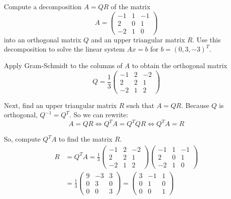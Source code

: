 \documentclass[12pt]{article}
\begin{document}
\begin{problem}{}{}
    Compute a decomposition $A = QR$ of the matrix
    $$
        A = \begin{pmatrix}
            -1 & 1 & -1 \\
            2 & 0 & 1 \\
            -2 & 1 & 0
        \end{pmatrix}
    $$
    into an orthogonal matrix $Q$ and an upper triangular matrix $R$. Use this decomposition to solve the linear system $Ax = b$ for $b = (0, 3, -3)^T$.
\end{problem}

Apply Gram-Schmidt to the columns of $A$ to obtain the orthogonal matrix
$$
    Q = \frac{1}{3} \begin{pmatrix}
        -1 & 2 & -2 \\
        2 & 2 & 1 \\
        -2 & 1 & 2
    \end{pmatrix}
$$

Next, find an upper triangular matrix $R$ such that $A = QR$. Because $Q$ is orthogonal, $Q^{-1} = Q^T$. So we can rewrite:
$$
    A = QR \iff Q^T A = Q^T Q R \iff Q^T A = R
$$

So, compute $Q^TA$ to find the matrix $R$. 
$$
\begin{aligned}
    R &= Q^TA = \frac{1}{3} \begin{pmatrix}
        -1 & 2 & -2 \\
        2 & 2 & 1 \\
        -2 & 1 & 2
    \end{pmatrix} \begin{pmatrix}
            -1 & 1 & -1 \\
            2 & 0 & 1 \\
            -2 & 1 & 0
        \end{pmatrix} \\
    &= \frac{1}{3}\begin{pmatrix}
        9 & -3 & 3 \\
        0 & 3 & 0 \\
        0 & 0 & 3
    \end{pmatrix} = \begin{pmatrix}
        3 & -1 & 1 \\
        0 & 1 & 0 \\
        0 & 0 & 1
    \end{pmatrix}
\end{aligned}
$$
\end{document}
